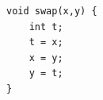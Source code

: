 \documentclass{jarticle}
\begin{document}
 \begin{verbatim}
void swap(x,y) {
    int t;
    t = x; 
    x = y;
    y = t;
}
 \end{verbatim}
\end{document}
